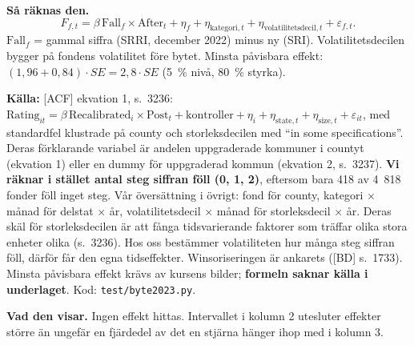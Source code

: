 \documentclass[10pt,a4paper]{article}
\newcommand{\kalla}[1]{\par\noindent\textbf{Källa:} #1\par}
\newcommand{\raknas}{\par\noindent\textbf{Så räknas den.} }
\newcommand{\visar}{\par\noindent\textbf{Vad den visar.} }
\newcommand{\kod}[1]{\texttt{#1}}
\begin{document}
\begin{table}[H]
\caption{Did funds whose risk number fell further receive more flow? Fund-month regressions of monthly flow (percent of assets) on Fall $\times$ After, where Fall is the number of classes the fund's risk number fell on 1 January 2023 (0, 1 or 2) and After is one from January 2023. Coefficients are multiplied by 12 and read as percentage points of assets per year. The specification follows equation 1 of Adelino, Cunha, and Ferreira (2017): column 1 has fund and category-by-month effects, column 2 adds volatility-decile-by-month effects, and column 3 adds the star rating as a control. Standard errors, in parentheses, are clustered by fund. The minimum detectable effect is 2.8 standard errors. January 2021 to December 2024. Flows are summed over the fund's non-institutional share classes that are not sold only in the United Kingdom, and winsorized at the 1st and 99th percentiles within month.}
\centering
\end{table}
\raknas
\begin{equation}
F_{f,t}=\beta\,\text{Fall}_f\times\text{After}_t+\eta_f+\eta_{\text{kategori},t}+\eta_{\text{volatilitetsdecil},t}+\varepsilon_{f,t}.
\end{equation}
$\text{Fall}_f$ = gammal siffra (SRRI, december 2022) minus ny (SRI). Volatilitetsdecilen bygger på fondens volatilitet före bytet. Minsta påvisbara effekt: $(1{,}96+0{,}84)\cdot SE=2{,}8\cdot SE$ (5~\% nivå, 80~\% styrka).
\kalla{[ACF] ekvation 1, s.~3236: $\text{Rating}_{it}=\beta\,\text{Recalibrated}_i\times\text{Post}_t+\text{kontroller}+\eta_i+\eta_{\text{state},t}+\eta_{\text{size},t}+\varepsilon_{it}$, med standardfel klustrade på county och storleksdecilen med ``in some specifications''. Deras förklarande variabel är andelen uppgraderade kommuner i countyt (ekvation 1) eller en dummy för uppgraderad kommun (ekvation 2, s.~3237). \textbf{Vi räknar i stället antal steg siffran föll (0, 1, 2)}, eftersom bara 418 av 4~818 fonder föll inget steg. Vår översättning i övrigt: fond för county, kategori $\times$ månad för delstat $\times$ år, volatilitetsdecil $\times$ månad för storleksdecil $\times$ år. Deras skäl för storleksdecilen är att fånga tidsvarierande faktorer som träffar olika stora enheter olika (s.~3236). Hos oss bestämmer volatiliteten hur många steg siffran föll, därför får den egna tidseffekter. Winsoriseringen är ankarets ([BD] s.~1733). Minsta påvisbara effekt krävs av kursens bilder; \textbf{formeln saknar källa i underlaget}. Kod: \kod{test/byte2023.py}.}
\visar Ingen effekt hittas. Intervallet i kolumn 2 utesluter effekter större än ungefär en fjärdedel av det en stjärna hänger ihop med i kolumn 3.
\end{document}
